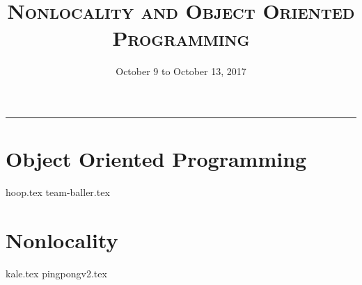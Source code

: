 \documentclass{exam}
\title{\textsc{Nonlocality and Object Oriented Programming}}
\date{October 9 to October 13, 2017}
\begin{document}
\maketitle
\rule{\textwidth}{0.15em}
\fontsize{12}{15}\selectfont

\section{Object Oriented Programming}
\begin{questions}
{hoop.tex}
{team-baller.tex}

\section{Nonlocality}
{kale.tex}
{pingpongv2.tex} 



\end{questions}
\end{document}

